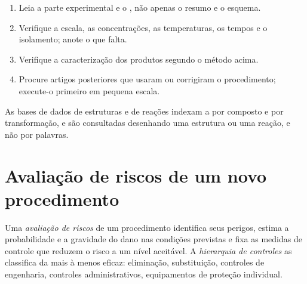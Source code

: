 \begin{method}\label{met:b3:lab-techniques-3:read-paper}
\begin{enumerate}
  \item Leia a parte experimental e o , não apenas o
        resumo e o esquema.
  \item Verifique a escala, as concentrações, as temperaturas, os tempos e o isolamento; anote
        o que falta.
  \item Verifique a caracterização dos produtos segundo o método acima.
  \item Procure artigos posteriores que usaram ou corrigiram o procedimento; execute-o primeiro em
        pequena escala.
\end{enumerate}
\end{method}

As bases de dados de estruturas e de reações indexam a  por composto e
por transformação, e são consultadas desenhando uma estrutura ou uma reação,
e não por palavras.

\section{Avaliação de riscos de um novo procedimento}

\begin{definition}\label{def:b3:lab-techniques-3:assessment}
Uma \emph{avaliação de riscos} de um procedimento identifica seus
perigos, estima a probabilidade e a gravidade do dano nas condições previstas
e fixa as medidas de controle que reduzem o risco a um nível aceitável. A
\emph{hierarquia de controles} as classifica da mais à
menos eficaz: eliminação, substituição, controles de engenharia,
controles administrativos, equipamentos de proteção individual.
\end{definition}

